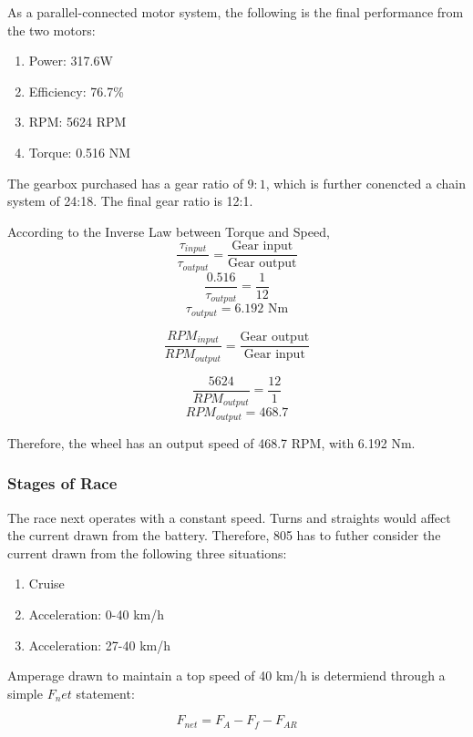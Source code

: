 \documentclass[12pt]{article}
\begin{document}
As a parallel-connected motor system, the following is the final performance from the two motors:
\begin{enumerate}
  \item Power: 317.6W
  \item Efficiency: 76.7\%
  \item RPM: 5624 RPM
  \item Torque: 0.516 NM
\end{enumerate}

The gearbox purchased has a gear ratio of $9:1$, which is further conencted a chain system of 24:18.
The final gear ratio is 12:1.

According to the Inverse Law between Torque and Speed,
\begin{equation}
  \frac{\tau_{input}}{\tau_{output}} = \frac{\text{Gear input}}{\text{Gear output}}
\end{equation}
\[\frac{0.516}{\tau_{output}} = \frac{1}{12}\]
\[\tau_{output} = 6.192 \text{~Nm}\]

\begin{equation}
  \frac{RPM_{input}}{RPM_{output}} = \frac{\text{Gear output}}{\text{Gear input}}
\end{equation}

\[\frac{5624}{RPM_{output}} = \frac{12}{1}\]
\[RPM_{output} = 468.7\]

Therefore, the wheel has an output speed of 468.7 RPM, with 6.192 Nm.


\subsubsection*{Stages of Race}

The race next operates with a constant speed. Turns and straights would affect
the current drawn from the battery. Therefore, 805 has to futher consider
the current drawn from the following three situations:
\begin{enumerate}
  \item Cruise
  \item Acceleration: 0-40 km/h
  \item Acceleration: 27-40 km/h
\end{enumerate}

Amperage drawn to maintain a top speed of 40 km/h is determiend through a simple $F_net$
statement:

\begin{equation}
  F_{net} = F_A - F_f - F_{AR}
\end{equation}
\end{document}

